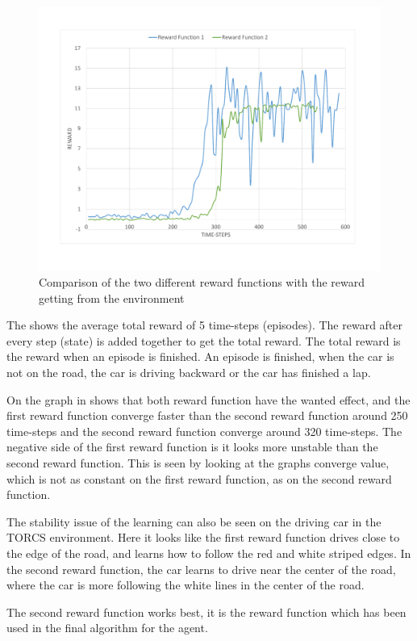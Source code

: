 \begin{figure}[H]
	\centering
	\includegraphics[width=1\textwidth]{Figures/Result/change_of_Reward_reward_graph.pdf}
	\caption{Comparison of the two different reward functions with the reward getting from the environment}
	\label{fig:change_of_Reward_reward_graph}
\end{figure}

The  shows the average total reward of 5 time-steps (episodes). The reward after every step (state) is added together to get the total reward. The total reward is the reward when an episode is finished. An episode is finished, when the car is not on the road, the car is driving backward or the car has finished a lap.   

On the graph in  shows that both reward function have the wanted effect, and the first reward function converge faster than the second reward function around 250 time-steps and the second reward function converge around 320 time-steps. The negative side of the first reward function is it looks more unstable than the second reward function. This is seen by looking at the graphs converge value, which is not as constant on the first reward function, as on the second reward function. 

The stability issue of the learning can also be seen on the driving car in the TORCS environment. Here it looks like the first reward function drives close to the edge of the road, and learns how to follow the red and white striped edges. In the second reward function, the car learns to drive near the center of the road, where the car is more following the white lines in the center of the road. 

The second reward function works best, it is the reward function which has been used in the final algorithm for the agent.
 
